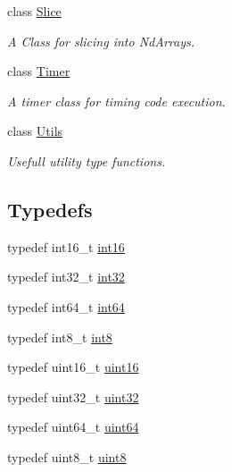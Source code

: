 \begin{DoxyCompactItemize}
class \mbox{\hyperlink{class_num_c_1_1_slice}{Slice}}
\begin{DoxyCompactList}\small\item\em A Class for slicing into Nd\+Arrays. \end{DoxyCompactList}\item 
class \mbox{\hyperlink{class_num_c_1_1_timer}{Timer}}
\begin{DoxyCompactList}\small\item\em A timer class for timing code execution. \end{DoxyCompactList}\item 
class \mbox{\hyperlink{class_num_c_1_1_utils}{Utils}}
\begin{DoxyCompactList}\small\item\em Usefull utility type functions. \end{DoxyCompactList}\end{DoxyCompactItemize}
\subsection*{Typedefs}
\begin{DoxyCompactItemize}
\item 
typedef int16\+\_\+t \mbox{\hyperlink{namespace_num_c_a55b6140ac3972d03a7277fc227478dc2}{int16}}
\item 
typedef int32\+\_\+t \mbox{\hyperlink{namespace_num_c_aa5a7e69266097d55816d4cdb19542b53}{int32}}
\item 
typedef int64\+\_\+t \mbox{\hyperlink{namespace_num_c_a96768695f3ea92cc3c4b79d37efb30c6}{int64}}
\item 
typedef int8\+\_\+t \mbox{\hyperlink{namespace_num_c_abc49745b062795c3d053780d36613404}{int8}}
\item 
typedef uint16\+\_\+t \mbox{\hyperlink{namespace_num_c_a870ab72deafe3efd4eb63e6a2e63a236}{uint16}}
\item 
typedef uint32\+\_\+t \mbox{\hyperlink{namespace_num_c_ae685802ca6d3035f2b400b081e3953fa}{uint32}}
\item 
typedef uint64\+\_\+t \mbox{\hyperlink{namespace_num_c_a22306a0884a815781c5b147415f6d817}{uint64}}
\item 
typedef uint8\+\_\+t \mbox{\hyperlink{namespace_num_c_a60b2e2f49e1ff61059731c154e560869}{uint8}}
\end{DoxyCompactItemize}
